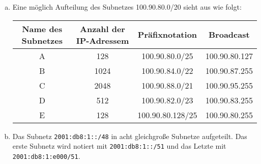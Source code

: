 

\pgfplotsset{compat=1.15}

\renewcommand{\arraystretch}{1.5}

\date{Mittwoch 8.1.2020}


\maketitle
\thispagestyle{fancy}

\begin{enumerate}[a)]
	\item Eine möglich Aufteilung des Subnetzes 100.90.80.0/20 sieht aus wie folgt: \\
	\begin{tabular}{c|c|c|c}
				Name des Subnetzes & Anzahl der IP-Adressem & Präfixnotation   & Broadcast     \\ \hline
				A 				   & 128                    & 100.90.80.0/25   & 100.90.80.127 \\
				B 				   & 1024                   & 100.90.84.0/22   & 100.90.87.255 \\
				C 				   & 2048                   & 100.90.88.0/21   & 100.90.95.255 \\
				D 				   & 512                    & 100.90.82.0/23   & 100.90.83.255 \\
				E 				   & 128                    & 100.90.80.128/25 & 100.90.80.255
		\end{tabular}
	\item Das Subnetz \texttt{2001:db8:1::/48} in acht gleichgroße Subnetze aufgeteilt. Das erste Subnetz wird notiert mit 
	\texttt{2001:db8:1::/51} und das Letzte mit \texttt{2001:db8:1:e000/51}.
	
\end{enumerate}

